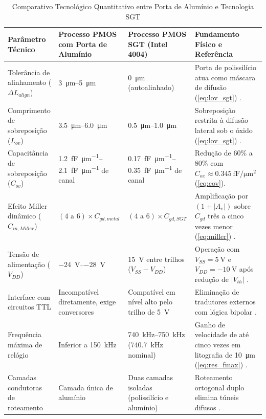 \begin{table}[!t]
\renewcommand{\arraystretch}{1.2}
\caption{Comparativo Tecnológico Quantitativo entre Porta de Alumínio e Tecnologia SGT}
\label{tab:comparativo_sgt}
\centering
\begin{tabularx}{\textwidth}{>{\raggedright\arraybackslash}p{3.4cm} >{\raggedright\arraybackslash}p{3.8cm} >{\raggedright\arraybackslash}p{4.1cm} >{\raggedright\arraybackslash}X}
\toprule
\textbf{Parâmetro Técnico} & \textbf{Processo PMOS com Porta de Alumínio} & \textbf{Processo PMOS SGT (Intel 4004)} & \textbf{Fundamento Físico e Referência} \\
\midrule
Tolerância de alinhamento ($\Delta L_{align}$) & \SIrange{3}{5}{\micro\meter} & \SI{0}{\micro\meter} (autoalinhado) & Porta de polissilício atua como máscara de difusão (\cref{eq:lov_sgt}) \cite{kerwin1969patent, faggin1970}. \\
Comprimento de sobreposição ($L_{ov}$) & \SIrange{3,5}{6,0}{\micro\meter} & \SIrange{0,5}{1,0}{\micro\meter} & Sobreposição restrita à difusão lateral sob o óxido (\cref{eq:lov_sgt}) \cite{faggin1970}. \\
Capacitância de sobreposição ($C_{ov}$) & \SIrange{1,2}{2,1}{\femto\farad\per\micro\meter} de canal & \SIrange{0,17}{0,35}{\femto\farad\per\micro\meter} de canal & Redução de 60\% a 80\% com $C_{ox} \approx \SI{0,345}{\femto\farad\per\micro\meter\squared}$ (\cref{eq:cov}). \\
Efeito Miller dinâmico ($C_{in,Miller}$) & $(4\text{ a }6) \times C_{gd,metal}$ & $(4\text{ a }6) \times C_{gd,SGT}$ & Amplificação por $(1 + |A_v|)$ sobre $C_{gd}$ três a cinco vezes menor (\cref{eq:miller}) \cite{sze2006}. \\
Tensão de alimentação ($V_{DD}$) & \SIrange{-24}{-28}{\volt} & \SI{15}{\volt} entre trilhos ($V_{SS} - V_{DD}$) & Operação com $V_{SS} = \SI{+5}{\volt}$ e $V_{DD} = \SI{-10}{\volt}$ após redução de $|V_{th}|$ \cite{intel1971datasheet}. \\
Interface com circuitos TTL & Incompatível diretamente, exige conversores & Compatível em nível alto pelo trilho de \SI{+5}{\volt} & Eliminação de tradutores externos com lógica bipolar \cite{intel1971datasheet}. \\
Frequência máxima de relógio & Inferior a \SI{150}{\kilo\hertz} & \SIrange{740}{750}{\kilo\hertz} (\SI{740,7}{\kilo\hertz} nominal) & Ganho de velocidade de até cinco vezes em litografia de \SI{10}{\micro\meter} (\cref{eq:res_fmax}) \cite{faggin1996}. \\
Camadas condutoras de roteamento & Camada única de alumínio & Duas camadas isoladas (polissilício e alumínio) & Roteamento ortogonal duplo elimina túneis difusos \cite{vadasz1972patent, faggin2021}. \\

\end{tabularx}
\end{table}
